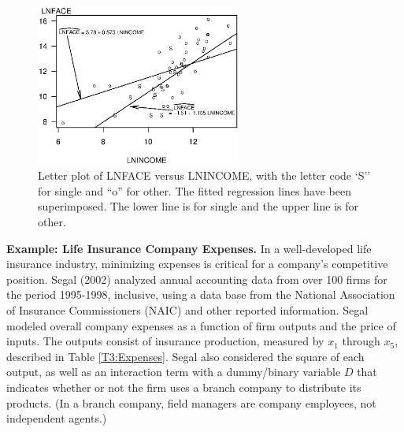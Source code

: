 \begin{figure}[htp]
  \begin{center}
    \includegraphics[width=0.6\textwidth]{Chapter3/F3LetterInteract.eps}
    \caption{\label{F3:LetterInteract} \small Letter plot of LNFACE versus LNINCOME,
    with the letter code `S'' for single
and ``o'' for other. The fitted regression lines have been
superimposed. The lower line is for single and the upper line is for
other.}
  \end{center}
\end{figure}

\linejed {}

\textbf{Example: Life Insurance Company Expenses.} In a well-developed life insurance
industry, minimizing expenses is critical for a company's
competitive position. Segal (2002) analyzed annual accounting data
from over 100 firms for the period 1995-1998, inclusive, using a
data base from the National Association of Insurance Commissioners
(NAIC) and other reported information. Segal modeled overall company
expenses as a function of firm outputs and the price of inputs. The
outputs consist of insurance production, measured by $x_1$ through
$x_5$, described in Table \ref{T3:Expenses}. Segal also considered
the square of each output, as well as an interaction term with a
dummy/binary variable $D$ that indicates whether or not the firm
uses a branch company to distribute its products. (In a branch
company, field managers are company employees, not independent
agents.)


